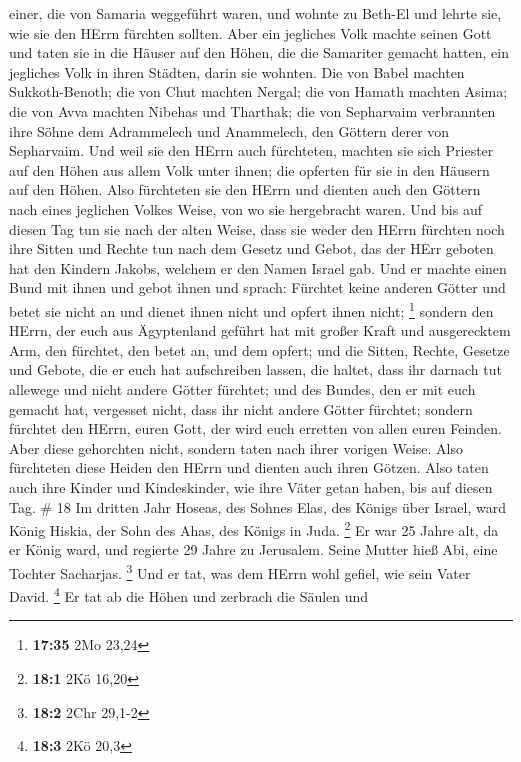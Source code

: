 einer, die von Samaria weggeführt waren, und wohnte zu Beth-El und
lehrte sie, wie sie den HErrn fürchten sollten.  Aber ein
jegliches Volk machte seinen Gott und taten sie in die Häuser auf den
Höhen, die die Samariter gemacht hatten, ein jegliches Volk in ihren
Städten, darin sie wohnten.  Die von Babel machten
Sukkoth-Benoth; die von Chut machten Nergal; die von Hamath machten
Asima;  die von Avva machten Nibehas und Tharthak; die von
Sepharvaim verbrannten ihre Söhne dem Adrammelech und Anammelech, den
Göttern derer von Sepharvaim.  Und weil sie den HErrn auch
fürchteten, machten sie sich Priester auf den Höhen aus allem Volk unter
ihnen; die opferten für sie in den Häusern auf den Höhen. 
Also fürchteten sie den HErrn und dienten auch den Göttern nach eines
jeglichen Volkes Weise, von wo sie hergebracht waren.  Und
bis auf diesen Tag tun sie nach der alten Weise, dass sie weder den
HErrn fürchten noch ihre Sitten und Rechte tun nach dem Gesetz und
Gebot, das der HErr geboten hat den Kindern Jakobs, welchem er den Namen
Israel gab.  Und er machte einen Bund mit ihnen und gebot
ihnen und sprach: Fürchtet keine anderen Götter und betet sie nicht an
und dienet ihnen nicht und opfert ihnen nicht; \footnote{\textbf{17:35}
  2Mo 23,24}  sondern den HErrn, der euch aus Ägyptenland
geführt hat mit großer Kraft und ausgerecktem Arm, den fürchtet, den
betet an, und dem opfert;  und die Sitten, Rechte, Gesetze
und Gebote, die er euch hat aufschreiben lassen, die haltet, dass ihr
darnach tut allewege und nicht andere Götter fürchtet;  und
des Bundes, den er mit euch gemacht hat, vergesset nicht, dass ihr nicht
andere Götter fürchtet;  sondern fürchtet den HErrn, euren
Gott, der wird euch erretten von allen euren Feinden.  Aber
diese gehorchten nicht, sondern taten nach ihrer vorigen Weise.
 Also fürchteten diese Heiden den HErrn und dienten auch
ihren Götzen. Also taten auch ihre Kinder und Kindeskinder, wie ihre
Väter getan haben, bis auf diesen Tag. \# 18  Im dritten
Jahr Hoseas, des Sohnes Elas, des Königs über Israel, ward König Hiskia,
der Sohn des Ahas, des Königs in Juda. \footnote{\textbf{18:1} 2Kö 16,20}
 Er war 25 Jahre alt, da er König ward, und regierte 29
Jahre zu Jerusalem. Seine Mutter hieß Abi, eine Tochter Sacharjas.
\footnote{\textbf{18:2} 2Chr 29,1-2}  Und er tat, was dem
HErrn wohl gefiel, wie sein Vater David. \footnote{\textbf{18:3} 2Kö
  20,3}  Er tat ab die Höhen und zerbrach die Säulen und
